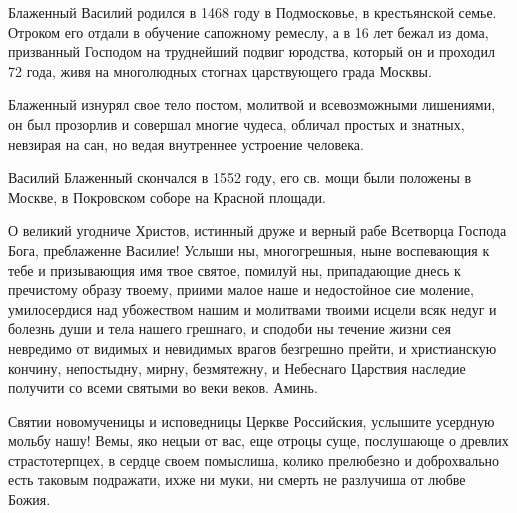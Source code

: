  
Блаженный Василий родился в 1468 году в Подмосковье, в крестьянской семье. Отроком его отдали в обучение сапожному ремеслу, а в 16 лет бежал из дома, призванный Господом на труднейший подвиг юродства, который он и проходил 72 года, живя на многолюдных стогнах царствующего града Москвы. 


Блаженный изнурял свое тело постом, молитвой и всевозможными лишениями, он был прозорлив и совершал многие чудеса, обличал простых и знатных, невзирая на сан, но ведая внутреннее устроение человека. 


Василий Блаженный скончался в 1552 году, его св. мощи были положены в Москве, в Покровском соборе на Красной площади.






О великий угодниче Христов, истинный друже и верный рабе Всетворца Господа Бога, преблаженне Василие! Услыши ны, многогрешныя, ныне воспевающия к тебе и призывающия имя твое святое, помилуй ны, припадающие днесь к пречистому образу твоему, приими малое наше и недостойное сие моление, умилосердися над убожеством нашим и молитвами твоими исцели всяк недуг и болезнь души и тела нашего грешнаго, и сподоби ны течение жизни сея невредимо от видимых и невидимых врагов безгрешно прейти, и христианскую кончину, непостыдну, мирну, безмятежну, и Небеснаго Царствия наследие получити со всеми святыми во веки веков. Аминь.\mychapterending

 



Святии новомученицы и исповедницы Церкве Российския, услышите усердную мольбу нашу! Вемы, яко нецыи от вас, еще отроцы суще, послушающе о древлих страстотерпцех, в сердце своем помыслиша, колико прелюбезно и доброхвально есть таковым подражати, ихже ни муки, ни смерть не разлучиша от любве Божия. 


